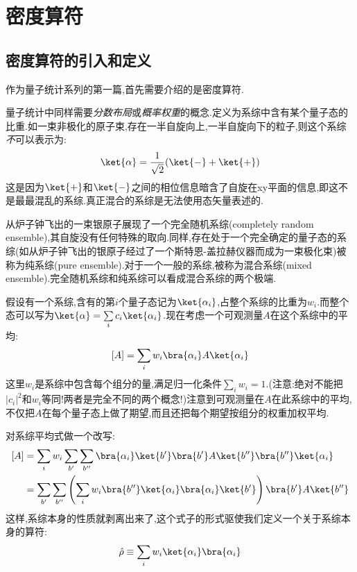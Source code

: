 
\section{密度算符}
\subsection{密度算符的引入和定义}
    作为量子统计系列的第一篇,首先需要介绍的是密度算符.
    
    \vspace*{0.5cm} 

    量子统计中同样需要\emph{分数布局}或\emph{概率权重}的概念.定义为系综中含有某个量子态的比重.如一束非极化的原子束,存在一半自旋向上,一半自旋向下的粒子,则这个系综\emph{不}可以表示为:
    \[\ket{\alpha}=\frac{1}{\sqrt{2}}(\ket{-}+\ket{+})\]
    这是因为$\ket{+}$和$\ket{-}$之间的相位信息暗含了自旋在xy平面的信息,即这不是最最混乱的系综.真正混合的系综是无法使用态矢量表述的.

    从炉子钟飞出的一束银原子展现了一个完全随机系综(completely random ensemble),其自旋没有任何特殊的取向.同样,存在处于一个完全确定的量子态的系综(如从炉子钟飞出的银原子经过了一个斯特恩-盖拉赫仪器而成为一束极化束)被称为纯系综(pure ensemble).对于一个一般的系综,被称为混合系综(mixed ensemble).完全随机系综和纯系综可以看成混合系综的两个极端.

    \vspace*{1cm}

    假设有一个系综,含有的第$i$个量子态记为$\ket{\alpha_i}$,占整个系综的比重为$w_i$.而整个态可以写为$\ket{\alpha}=\sum\limits_i c_i \ket{\alpha_i}$.现在考虑一个可观测量$A$在这个系综中的平均:
    \[[A]=\sum_i w_i \bra{\alpha_i}A\ket{\alpha_i}\]
    这里$w_i$是系综中包含每个组分的量,满足归一化条件$\sum\limits_i w_i=1$.(注意:绝对不能把$\left\vert c_i \right\vert ^{2}$和$w_i$等同!两者是完全不同的两个概念!)注意到可观测量在$A$在此系综中的平均,不仅把$A$在每个量子态上做了期望,而且还把每个期望按组分的权重加权平均.

    \vspace*{0.5cm}

    对系综平均式做一个改写:
    \begin{align*}
     \left[ A \right] &=\sum_i w_i \sum_{b'}\sum_{b''}\bra{\alpha_i}\ket{b'}\bra{b'}A\ket{b''}\bra{b''}\ket{\alpha_i}\\ 
     &=\sum_{b'}\sum_{b''}\left( \sum_i w_i \bra{b''}\ket{\alpha_i}\bra{\alpha_i}\ket{b'} \right) \bra{b'}A\ket{b''}
    \end{align*}
    这样,系综本身的性质就剥离出来了,这个式子的形式驱使我们定义一个关于系综本身的算符:
    \begin{equation}
      \hat{\rho}\equiv \sum_i w_i \ket{\alpha_i}\bra{\alpha_i}
    \end{equation}
    
